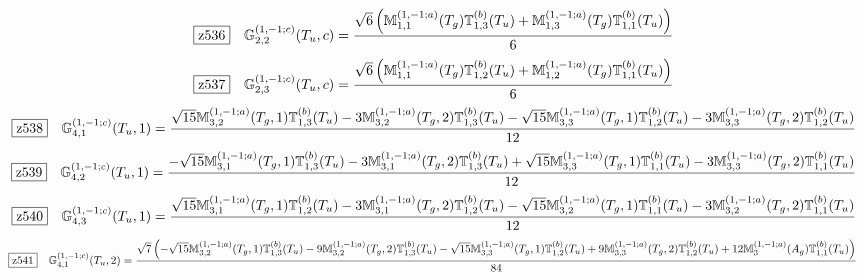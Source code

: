 \documentclass[fleqn,10pt,landscape]{jsarticle}
\begin{document}
\begin{dmath*}
\hspace*{3mm}\fbox{z536}\quad \mathbb{G}_{2,2}^{(1,-1;c)}(T_{u},c)=\frac{\sqrt{6} \left(\mathbb{M}_{1,1}^{(1,-1;a)}(T_{g}) \mathbb{T}_{1,3}^{(b)}(T_{u}) + \mathbb{M}_{1,3}^{(1,-1;a)}(T_{g}) \mathbb{T}_{1,1}^{(b)}(T_{u})\right)}{6}
\end{dmath*}
\begin{dmath*}
\hspace*{3mm}\fbox{z537}\quad \mathbb{G}_{2,3}^{(1,-1;c)}(T_{u},c)=\frac{\sqrt{6} \left(\mathbb{M}_{1,1}^{(1,-1;a)}(T_{g}) \mathbb{T}_{1,2}^{(b)}(T_{u}) + \mathbb{M}_{1,2}^{(1,-1;a)}(T_{g}) \mathbb{T}_{1,1}^{(b)}(T_{u})\right)}{6}
\end{dmath*}
\begin{dmath*}
\hspace*{3mm}\fbox{z538}\quad \mathbb{G}_{4,1}^{(1,-1;c)}(T_{u},1)=\frac{\sqrt{15} \mathbb{M}_{3,2}^{(1,-1;a)}(T_{g},1) \mathbb{T}_{1,3}^{(b)}(T_{u}) - 3 \mathbb{M}_{3,2}^{(1,-1;a)}(T_{g},2) \mathbb{T}_{1,3}^{(b)}(T_{u}) - \sqrt{15} \mathbb{M}_{3,3}^{(1,-1;a)}(T_{g},1) \mathbb{T}_{1,2}^{(b)}(T_{u}) - 3 \mathbb{M}_{3,3}^{(1,-1;a)}(T_{g},2) \mathbb{T}_{1,2}^{(b)}(T_{u})}{12}
\end{dmath*}
\begin{dmath*}
\hspace*{3mm}\fbox{z539}\quad \mathbb{G}_{4,2}^{(1,-1;c)}(T_{u},1)=\frac{- \sqrt{15} \mathbb{M}_{3,1}^{(1,-1;a)}(T_{g},1) \mathbb{T}_{1,3}^{(b)}(T_{u}) - 3 \mathbb{M}_{3,1}^{(1,-1;a)}(T_{g},2) \mathbb{T}_{1,3}^{(b)}(T_{u}) + \sqrt{15} \mathbb{M}_{3,3}^{(1,-1;a)}(T_{g},1) \mathbb{T}_{1,1}^{(b)}(T_{u}) - 3 \mathbb{M}_{3,3}^{(1,-1;a)}(T_{g},2) \mathbb{T}_{1,1}^{(b)}(T_{u})}{12}
\end{dmath*}
\begin{dmath*}
\hspace*{3mm}\fbox{z540}\quad \mathbb{G}_{4,3}^{(1,-1;c)}(T_{u},1)=\frac{\sqrt{15} \mathbb{M}_{3,1}^{(1,-1;a)}(T_{g},1) \mathbb{T}_{1,2}^{(b)}(T_{u}) - 3 \mathbb{M}_{3,1}^{(1,-1;a)}(T_{g},2) \mathbb{T}_{1,2}^{(b)}(T_{u}) - \sqrt{15} \mathbb{M}_{3,2}^{(1,-1;a)}(T_{g},1) \mathbb{T}_{1,1}^{(b)}(T_{u}) - 3 \mathbb{M}_{3,2}^{(1,-1;a)}(T_{g},2) \mathbb{T}_{1,1}^{(b)}(T_{u})}{12}
\end{dmath*}
\begin{dmath*}
\hspace*{3mm}\fbox{z541}\quad \mathbb{G}_{4,1}^{(1,-1;c)}(T_{u},2)=\frac{\sqrt{7} \left(- \sqrt{15} \mathbb{M}_{3,2}^{(1,-1;a)}(T_{g},1) \mathbb{T}_{1,3}^{(b)}(T_{u}) - 9 \mathbb{M}_{3,2}^{(1,-1;a)}(T_{g},2) \mathbb{T}_{1,3}^{(b)}(T_{u}) - \sqrt{15} \mathbb{M}_{3,3}^{(1,-1;a)}(T_{g},1) \mathbb{T}_{1,2}^{(b)}(T_{u}) + 9 \mathbb{M}_{3,3}^{(1,-1;a)}(T_{g},2) \mathbb{T}_{1,2}^{(b)}(T_{u}) + 12 \mathbb{M}_{3}^{(1,-1;a)}(A_{g}) \mathbb{T}_{1,1}^{(b)}(T_{u})\right)}{84}
\end{dmath*}
\end{document}
